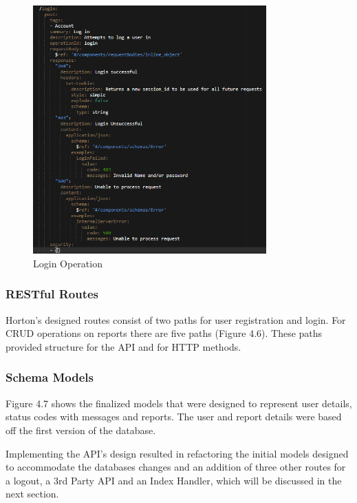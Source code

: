 \begin{figure}[H]
    \caption{Login Operation}
    \label{image:operationId}
    \centering
    \includegraphics[width=0.8\textwidth]{images/open_api/login-spec.png}
\end{figure}

\subsubsection{RESTful Routes}
Horton's designed routes consist of two paths for user registration and login. For CRUD operations on reports there are five paths (Figure 4.6). These paths provided structure for the API and for HTTP methods.

\subsubsection{Schema Models}
Figure 4.7 shows the finalized models that were designed to represent user details, status codes with messages and reports. The user and report details were based off the first version of the database. 

Implementing the API’s design resulted in refactoring the initial models designed to accommodate the databases changes and an addition of three other routes for a logout, a 3rd Party API and an Index Handler, which will be discussed in the next section.

